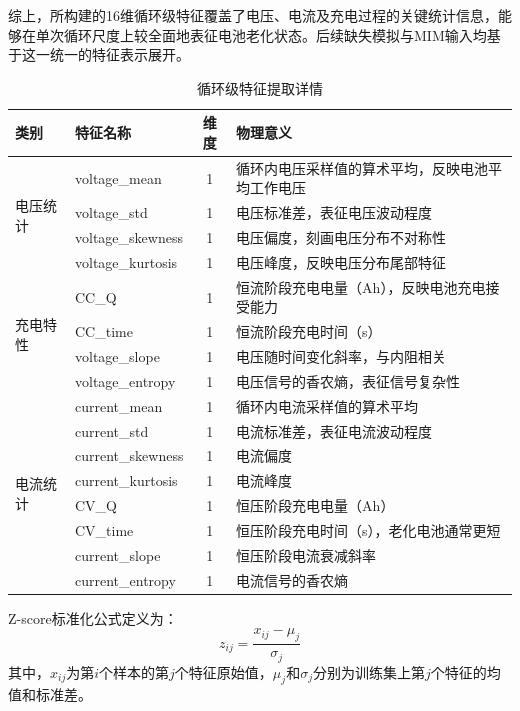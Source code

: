 \documentclass[10pt,a4paper]{ctexart}
\begin{document}
综上，所构建的16维循环级特征覆盖了电压、电流及充电过程的关键统计信息，能够在单次循环尺度上较全面地表征电池老化状态。后续缺失模拟与MIM输入均基于这一统一的特征表示展开。

\begin{table}[H]
\centering
\caption{循环级特征提取详情}
\label{tab:features}
\begin{tabular}{@{}llcp{6cm}@{}}
\toprule
\textbf{类别} & \textbf{特征名称} & \textbf{维度} & \textbf{物理意义} \\
\midrule
\multirow{4}{*}{电压统计} 
& voltage\_mean & 1 & 循环内电压采样值的算术平均，反映电池平均工作电压 \\
& voltage\_std & 1 & 电压标准差，表征电压波动程度 \\
& voltage\_skewness & 1 & 电压偏度，刻画电压分布不对称性 \\
& voltage\_kurtosis & 1 & 电压峰度，反映电压分布尾部特征 \\
\midrule
\multirow{4}{*}{充电特性} 
& CC\_Q & 1 & 恒流阶段充电电量（Ah），反映电池充电接受能力 \\
& CC\_time & 1 & 恒流阶段充电时间（s） \\
& voltage\_slope & 1 & 电压随时间变化斜率，与内阻相关 \\
& voltage\_entropy & 1 & 电压信号的香农熵，表征信号复杂性 \\
\midrule
\multirow{8}{*}{电流统计} 
& current\_mean & 1 & 循环内电流采样值的算术平均 \\
& current\_std & 1 & 电流标准差，表征电流波动程度 \\
& current\_skewness & 1 & 电流偏度 \\
& current\_kurtosis & 1 & 电流峰度 \\
& CV\_Q & 1 & 恒压阶段充电电量（Ah） \\
& CV\_time & 1 & 恒压阶段充电时间（s），老化电池通常更短 \\
& current\_slope & 1 & 恒压阶段电流衰减斜率 \\
& current\_entropy & 1 & 电流信号的香农熵 \\
\bottomrule
\end{tabular}
\end{table}

Z-score标准化公式定义为：
\begin{equation}
    z_{ij} = \frac{x_{ij} - \mu_j}{\sigma_j}
\end{equation}
其中，$x_{ij}$为第$i$个样本的第$j$个特征原始值，$\mu_j$和$\sigma_j$分别为训练集上第$j$个特征的均值和标准差。
\end{document}
